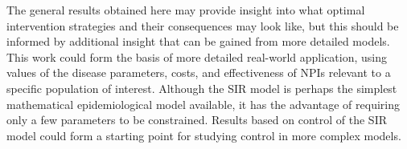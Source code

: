 \documentclass[english,12pt,letter]{article}
\begin{document}
The general results obtained here may provide insight
into what optimal intervention strategies and their consequences may look like,
but this should be informed by additional insight that can be gained
from more detailed models.
This work could form the basis of more detailed real-world application,
using values of the disease parameters, costs, and effectiveness of NPIs
relevant to a specific population of interest.  Although the SIR model
is perhaps the simplest mathematical epidemiological model available,
it has the advantage of requiring only a few parameters to be constrained.
Results based on control of the SIR model could form a starting point for
studying control in more complex models.



\end{document}
